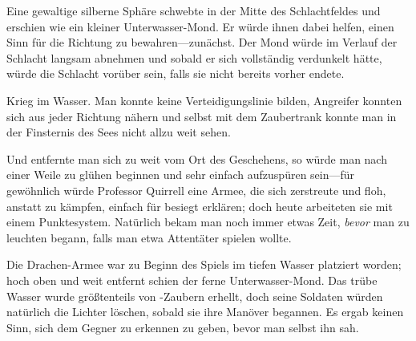 Eine gewaltige silberne Sphäre schwebte in der Mitte des Schlachtfeldes und erschien wie ein kleiner Unterwasser-Mond. Er würde ihnen dabei helfen, einen Sinn für die Richtung zu bewahren—zunächst. Der Mond würde im Verlauf der Schlacht langsam abnehmen und sobald er sich vollständig verdunkelt hätte, würde die Schlacht vorüber sein, falls sie nicht bereits vorher endete.

Krieg im Wasser. Man konnte keine Verteidigungslinie bilden, Angreifer konnten sich aus jeder Richtung nähern und selbst mit dem Zaubertrank konnte man in der Finsternis des Sees nicht allzu weit sehen.

Und entfernte man sich zu weit vom Ort des Geschehens, so würde man nach einer Weile zu glühen beginnen und sehr einfach aufzuspüren sein—für gewöhnlich würde Professor Quirrell eine Armee, die sich zerstreute und floh, anstatt zu kämpfen, einfach für besiegt erklären; doch heute arbeiteten sie mit einem Punktesystem. Natürlich bekam man noch immer etwas Zeit, \emph{bevor} man zu leuchten begann, falls man etwa Attentäter spielen wollte.

Die Drachen-Armee war zu Beginn des Spiels im tiefen Wasser platziert worden; hoch oben und weit entfernt schien der ferne Unterwasser-Mond. Das trübe Wasser wurde größtenteils von -Zaubern erhellt, doch seine Soldaten würden natürlich die Lichter löschen, sobald sie ihre Manöver begannen. Es ergab keinen Sinn, sich dem Gegner zu erkennen zu geben, bevor man selbst ihn sah.

